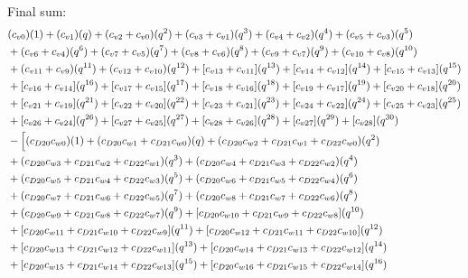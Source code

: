 \documentclass[12pt]{article}
\begin{document}
Final sum:
\begin{align}
    &(c_{v0})(1) + (c_{v1})(q) + (c_{v2} + c_{v0})(q^2) + (c_{v3} + c_{v1})(q^3) + (c_{v4} + c_{v2})(q^4) + (c_{v5} + c_{v3})(q^5) \nonumber\\
    &+ (c_{v6} + c_{v4})(q^6) + (c_{v7} + c_{v5})(q^7) + (c_{v8} + c_{v6})(q^8) + (c_{v9} + c_{v7})(q^9) + (c_{v10} + c_{v8})(q^{10}) \nonumber\\
    &+ (c_{v11} + c_{v9})(q^{11}) + (c_{v12} + c_{v10})(q^{12}) + [c_{v13} + c_{v11}](q^{13}) + [c_{v14} + c_{v12}](q^{14}) + [c_{v15} + c_{v13}](q^{15}) \nonumber\\
    &+ [c_{v16} + c_{v14}](q^{16}) + [c_{v17} + c_{v15}](q^{17}) + [c_{v18} + c_{v16}](q^{18}) + [c_{v19} + c_{v17}](q^{19}) + [c_{v20} + c_{v18}](q^{20}) \nonumber\\
    &+ [c_{v21} + c_{v19}](q^{21}) + [c_{v22} + c_{v20}](q^{22}) + [c_{v23} + c_{v21}](q^{23}) + [c_{v24} + c_{v22}](q^{24}) + [c_{v25} + c_{v23}](q^{25}) \nonumber\\
    &+ [c_{v26} + c_{v24}](q^{26}) + [c_{v27} + c_{v25}](q^{27}) + [c_{v28} + c_{v26}](q^{28}) + [c_{v27}](q^{29}) + [c_{v28}](q^{30}) \nonumber\\
    &- \Bigl[ (c_{D20}c_{w0})(1) + (c_{D20}c_{w1} + c_{D21}c_{w0})(q) + (c_{D20}c_{w2} + c_{D21}c_{w1} + c_{D22}c_{w0})(q^2) \nonumber\\
    &+ (c_{D20}c_{w3} + c_{D21}c_{w2} + c_{D22}c_{w1})(q^3) + (c_{D20}c_{w4} + c_{D21}c_{w3} + c_{D22}c_{w2})(q^4) \nonumber\\
    &+ (c_{D20}c_{w5} + c_{D21}c_{w4} + c_{D22}c_{w3})(q^5) + (c_{D20}c_{w6} +  c_{D21}c_{w5} + c_{D22}c_{w4})(q^6) \nonumber\\
    &+ (c_{D20}c_{w7} + c_{D21}c_{w6} + c_{D22}c_{w5})(q^7) + (c_{D20}c_{w8} + c_{D21}c_{w7} + c_{D22}c_{w6})(q^8) \nonumber\\
    &+ (c_{D20}c_{w9} + c_{D21}c_{w8} + c_{D22}c_{w7})(q^9) + [c_{D20}c_{w10} + c_{D21}c_{w9} + c_{D22}c_{w8}](q^{10}) \nonumber\\
    &+ [c_{D20}c_{w11} + c_{D21}c_{w10} + c_{D22}c_{w9}](q^{11}) + [c_{D20}c_{w12} + c_{D21}c_{w11} + c_{D22}c_{w10}](q^{12}) \nonumber\\
    &+ [c_{D20}c_{w13} + c_{D21}c_{w12} + c_{D22}c_{w11}](q^{13}) + [c_{D20}c_{w14} + c_{D21}c_{w13} + c_{D22}c_{w12}](q^{14}) \nonumber\\
    &+ [c_{D20}c_{w15} + c_{D21}c_{w14} + c_{D22}c_{w13}](q^{15}) + [c_{D20}c_{w16} + c_{D21}c_{w15} + c_{D22}c_{w14}](q^{16}) \nonumber\\

\end{align}
\end{document}
